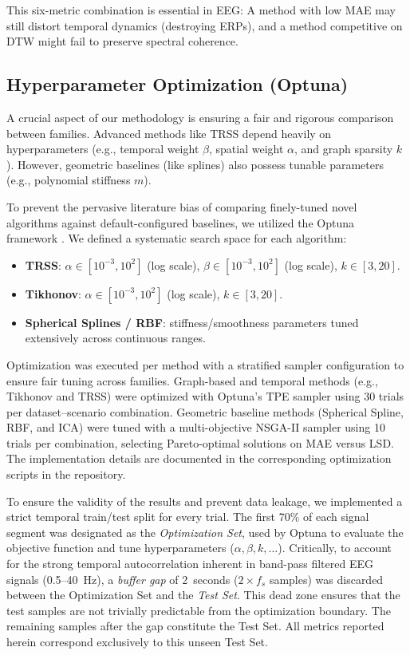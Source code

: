 This six-metric combination is essential in EEG: A method with low MAE may still distort temporal dynamics (destroying ERPs), and a method competitive on DTW might fail to preserve spectral coherence.

\subsection{Hyperparameter Optimization (Optuna)}

A crucial aspect of our methodology is ensuring a fair and rigorous comparison between families. Advanced methods like TRSS depend heavily on hyperparameters (e.g., temporal weight $\beta$, spatial weight $\alpha$, and graph sparsity $k$). However, geometric baselines (like splines) also possess tunable parameters (e.g., polynomial stiffness $m$).

To prevent the pervasive literature bias of comparing finely-tuned novel algorithms against default-configured baselines, we utilized the Optuna framework \cite{akiba2019optuna}. We defined a systematic search space for each algorithm:
\begin{itemize}
\item \textbf{TRSS}: $\alpha \in [10^{-3}, 10^{2}]$ (log scale), $\beta \in [10^{-3}, 10^{2}]$ (log scale), $k \in [3, 20]$.
\item \textbf{Tikhonov}: $\alpha \in [10^{-3}, 10^{2}]$ (log scale), $k \in [3, 20]$.
\item \textbf{Spherical Splines / RBF}: stiffness/smoothness parameters tuned extensively across continuous ranges.
\end{itemize}
Optimization was executed per method with a stratified sampler configuration to ensure fair tuning across families. Graph-based and temporal methods (e.g., Tikhonov and TRSS) were optimized with Optuna's TPE sampler using 30 trials per dataset--scenario combination. Geometric baseline methods (Spherical Spline, RBF, and ICA) were tuned with a multi-objective NSGA-II sampler using 10 trials per combination, selecting Pareto-optimal solutions on MAE versus LSD. The implementation details are documented in the corresponding optimization scripts in the repository.

To ensure the validity of the results and prevent data leakage, we implemented a strict temporal train/test split for every trial. The first 70\% of each signal segment was designated as the \emph{Optimization Set}, used by Optuna to evaluate the objective function and tune hyperparameters ($\alpha, \beta, k, \dots$). Critically, to account for the strong temporal autocorrelation inherent in band-pass filtered EEG signals (0.5--40~Hz), a \emph{buffer gap} of 2~seconds ($2 \times f_s$ samples) was discarded between the Optimization Set and the \emph{Test Set}. This dead zone ensures that the test samples are not trivially predictable from the optimization boundary. The remaining samples after the gap constitute the Test Set. All metrics reported herein correspond exclusively to this unseen Test Set.

